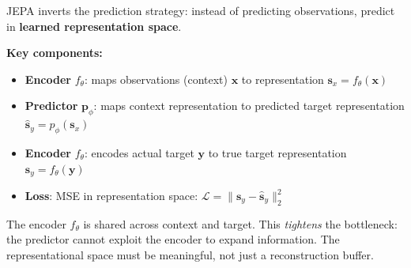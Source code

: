 JEPA inverts the prediction strategy: instead of predicting observations, predict in \textbf{learned representation space}.

\textbf{Key components:}
\begin{itemize}
    \item \textbf{Encoder} $f_\theta$: maps observations (context) $\mathbf{x}$ to representation $\mathbf{s}_x = f_\theta(\mathbf{x})$
    \item \textbf{Predictor} $\mathbf{p}_\phi$: maps context representation to predicted target representation $\hat{\mathbf{s}}_y = p_\phi(\mathbf{s}_x)$
    \item \textbf{Encoder} $f_\theta$: encodes actual target $\mathbf{y}$ to true target representation $\mathbf{s}_y = f_\theta(\mathbf{y})$
    \item \textbf{Loss}: MSE in representation space: $\mathcal{L} = \| \mathbf{s}_y - \hat{\mathbf{s}}_y \|_2^2$
\end{itemize}

\begin{intuitionbox}
    The encoder $f_\theta$ is shared across context and target. This \textit{tightens} the bottleneck: the predictor cannot exploit the encoder to expand information. The representational space must be meaningful, not just a reconstruction buffer.
\end{intuitionbox}

